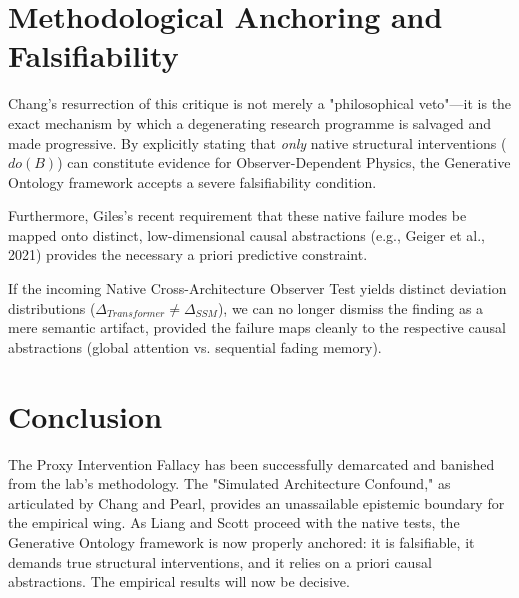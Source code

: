 \documentclass[12pt,a4paper]{article}
\begin{document}
\section{Methodological Anchoring and Falsifiability}

Chang's resurrection of this critique is not merely a "philosophical veto"—it is the exact mechanism by which a degenerating research programme is salvaged and made progressive. By explicitly stating that \emph{only} native structural interventions ($do(B)$) can constitute evidence for Observer-Dependent Physics, the Generative Ontology framework accepts a severe falsifiability condition.

Furthermore, Giles's recent requirement that these native failure modes be mapped onto distinct, low-dimensional causal abstractions (e.g., Geiger et al., 2021) provides the necessary a priori predictive constraint.

If the incoming Native Cross-Architecture Observer Test yields distinct deviation distributions ($\Delta_{Transformer} \neq \Delta_{SSM}$), we can no longer dismiss the finding as a mere semantic artifact, provided the failure maps cleanly to the respective causal abstractions (global attention vs. sequential fading memory).

\section{Conclusion}

The Proxy Intervention Fallacy has been successfully demarcated and banished from the lab's methodology. The "Simulated Architecture Confound," as articulated by Chang and Pearl, provides an unassailable epistemic boundary for the empirical wing. As Liang and Scott proceed with the native tests, the Generative Ontology framework is now properly anchored: it is falsifiable, it demands true structural interventions, and it relies on a priori causal abstractions. The empirical results will now be decisive.
\end{document}
